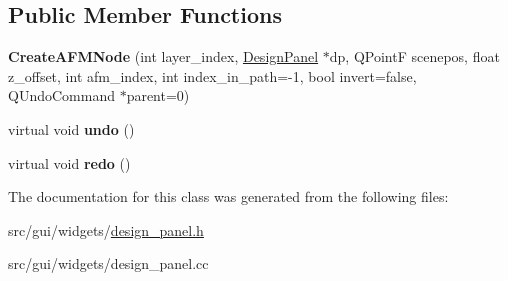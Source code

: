 \subsection*{Public Member Functions}
\begin{DoxyCompactItemize}
\item 
{\bfseries Create\+A\+F\+M\+Node} (int layer\+\_\+index, \hyperlink{classgui_1_1DesignPanel}{Design\+Panel} $\ast$dp, Q\+PointF scenepos, float z\+\_\+offset, int afm\+\_\+index, int index\+\_\+in\+\_\+path=-\/1, bool invert=false, Q\+Undo\+Command $\ast$parent=0)\hypertarget{classgui_1_1DesignPanel_1_1CreateAFMNode_ad90c015cd6b5452d72efc4d4592bbeff}{}\label{classgui_1_1DesignPanel_1_1CreateAFMNode_ad90c015cd6b5452d72efc4d4592bbeff}

\item 
virtual void {\bfseries undo} ()\hypertarget{classgui_1_1DesignPanel_1_1CreateAFMNode_a05f5e9c036a7cce9f697965a8d345d7a}{}\label{classgui_1_1DesignPanel_1_1CreateAFMNode_a05f5e9c036a7cce9f697965a8d345d7a}

\item 
virtual void {\bfseries redo} ()\hypertarget{classgui_1_1DesignPanel_1_1CreateAFMNode_a0419aa498b760398480d4b112982d50d}{}\label{classgui_1_1DesignPanel_1_1CreateAFMNode_a0419aa498b760398480d4b112982d50d}

\end{DoxyCompactItemize}


The documentation for this class was generated from the following files\+:\begin{DoxyCompactItemize}
\item 
src/gui/widgets/\hyperlink{design__panel_8h}{design\+\_\+panel.\+h}\item 
src/gui/widgets/design\+\_\+panel.\+cc\end{DoxyCompactItemize}
